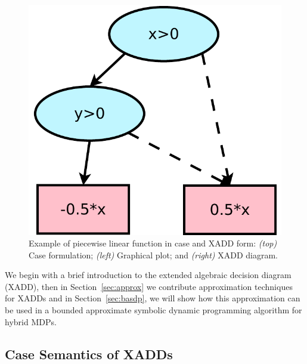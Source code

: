 \begin{figure}[t!]
\begin{minipage}{0.3\textwidth}
\end{minipage}
\begin{minipage}{0.15\textwidth}
\center
\vspace{-13mm}
\includegraphics[width=\textwidth]{Figures/xadds/dia2.pdf}
\end{minipage}
\vspace{-10mm}

\caption{Example of piecewise linear function in case and XADD form: \emph{(top)} Case formulation; \emph{(left)} Graphical plot; and \emph{(right)} XADD diagram.}
\label{fig:symbex}
\end{figure}

\label{sec:xadd}

We begin with a brief introduction to the extended algebraic decision
diagram (XADD), then in Section~\ref{sec:approx} we contribute
approximation techniques for XADDs and in Section~\ref{sec:basdp}, we
will show how this approximation can be used in a bounded
approximate symbolic dynamic programming algorithm for hybrid MDPs.

\subsection{Case Semantics of XADDs}



